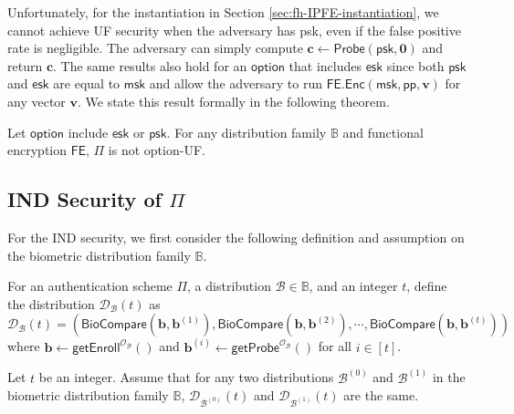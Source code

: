 Unfortunately, for the instantiation in Section \ref{sec:fh-IPFE-instantiation}, we cannot achieve UF security when the adversary has \textsf{psk}, even if the false positive rate is negligible. The adversary can simply compute $\mathbf{c} \gets \textsf{Probe}(\textsf{psk}, \mathbf{0})$ and return $\mathbf{c}$. The same results also hold for an $\textsf{option}$ that includes $\textsf{esk}$ since both $\textsf{psk}$ and $\textsf{esk}$ are equal to $\textsf{msk}$ and allow the adversary to run $\textsf{FE.Enc}(\textsf{msk}, \textsf{pp}, \mathbf{v})$ for any vector $\mathbf{v}$. We state this result formally in the following theorem.

\begin{theorem}

Let $\textsf{option}$ include $\textsf{esk}$ or $\textsf{psk}$. For any distribution family $\mathbb{B}$ and functional encryption $\textsf{FE}$, $\Pi$ is not \textsf{option}-UF.

\end{theorem}




\subsection{IND Security of $\Pi$}
\label{sec:security_analysis:fh-IPFE:IND}

For the IND security, we first consider the following definition and assumption on the biometric distribution family $\mathbb{B}$.

\begin{definition}
For an authentication scheme $\Pi$, a distribution $\mathcal{B} \in \mathbb{B}$, and an integer $t$, define the distribution $\mathcal{D}_\mathcal{B}(t)$ as
\[
	\mathcal{D}_\mathcal{B}(t) = \left( \textsf{BioCompare}(\mathbf{b}, \mathbf{b}^{(1)}), \textsf{BioCompare}(\mathbf{b}, \mathbf{b}^{(2)}), \cdots, \textsf{BioCompare}(\mathbf{b}, \mathbf{b}^{(t)}) \right)
\]
where $\mathbf{b} \gets \textsf{getEnroll}^{\mathcal{O}_\mathcal{B}}()$ and $ \mathbf{b}^{(i)} \gets \textsf{getProbe}^{\mathcal{O}_\mathcal{B}}()$ for all $i \in [t]$.

\end{definition}

\begin{assumption}
\label{assump:equal_distance}
Let $t$ be an integer. Assume that for any two distributions $\mathcal{B}^{(0)}$ and $\mathcal{B}^{(1)}$ in the biometric distribution family $\mathbb{B}$, $\mathcal{D}_{ \mathcal{B}^{(0)} }(t)$ and $\mathcal{D}_{ \mathcal{B}^{(1)} }(t)$ are the same. 

\end{assumption}

